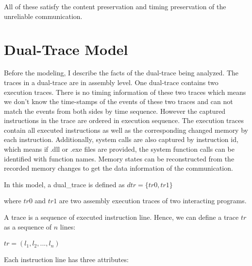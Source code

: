 All of these satisfy the content preservation and timing preservation of the unreliable communication.


\section{Dual-Trace Model}
Before the modeling, I describe the facts of the dual-trace being analyzed. The traces in a dual-trace are in assembly level. One dual-trace contains two execution traces. There is no timing information of these two traces which means we don't know the time-stamps of the events of these two traces and can not match the events from both sides by time sequence. However the captured instructions in the trace are ordered in execution sequence. The execution traces contain all executed instructions as well as the corresponding changed memory by each instruction. Additionally, system calls are also captured by instruction id, which means if .dll or .exe files are provided, the system function calls can be identified with function names. Memory states can be reconstructed from the recorded memory changes to get the data information of the communication. 

In this model,  a dual\_trace is defined as $dtr = \lbrace tr0, tr1\rbrace$

where $tr0$ and $tr1$ are two assembly execution traces of two interacting programs.

A trace is a sequence of executed instruction line. Hence, we can define a trace $tr$ as a sequence of $n$ lines:

$ tr = (l_1, l_2, ..., l_n)$ 

Each instruction line has three attributes:


